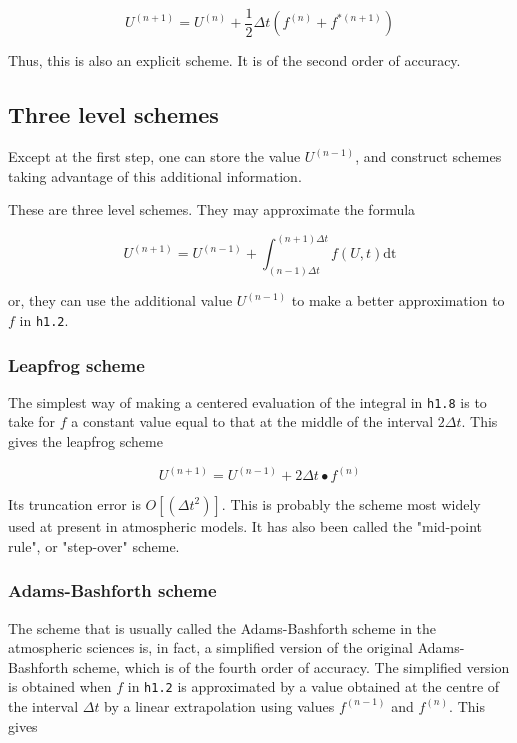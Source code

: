 \[U^{\left( n + 1 \right)} = U^{\left( n \right)} + \frac{1}{2}\Delta t\left( f^{\left( n \right)} + f^{*\left( n + 1 \right)} \right)\]

Thus, this is also an explicit scheme. It is of the second order of
accuracy.

\subsection{Three level schemes}\label{subsec:three-level-schemes}

Except at the first step, one can store the value
\(U^{\left( n - 1 \right)}\), and construct schemes taking advantage of
this additional information.

These are three level schemes. They may approximate the formula

\[U^{( n + 1 )} = U^{( n - 1 )} + \int_{( n - 1 )\Delta t}^{( n + 1 )\Delta t}f\left( U,t \right)\text{dt}\]

or, they can use the additional value \(U^{\left( n - 1 \right)}\) to
make a better approximation to \(f\) in \texttt{h1.2}.

\subsubsection{Leapfrog scheme}\label{subsubsec:leapfrog-scheme}

The simplest way of making a centered evaluation of the integral in
\texttt{h1.8} is to take for \(f\) a constant value equal to that at the
middle of the interval \(2\Delta t\). This gives the leapfrog scheme

\[U^{\left( n + 1 \right)} = U^{\left( n - 1 \right)} + 2\Delta t \bullet f^{\left( n \right)}\]

Its truncation error is
\( O\left\lbrack \left( {\Delta t}^{2} \right) \right\rbrack\). This is
probably the scheme most widely used at present in atmospheric models.
It has also been called the "mid-point rule", or "step-over" scheme.

\subsubsection{Adams-Bashforth scheme}\label{subsubsec:adams-bashforth-scheme}

The scheme that is usually called the Adams-Bashforth scheme in the
atmospheric sciences is, in fact, a simplified version of the original
Adams-Bashforth scheme, which is of the fourth order of accuracy. The
simplified version is obtained when \(f\) in \texttt{h1.2} is
approximated by a value obtained at the centre of the interval
\(\Delta t\) by a linear extrapolation using values
\(f^{\left( n - 1 \right)}\) and \(f^{\left( n \right)}\). This gives

